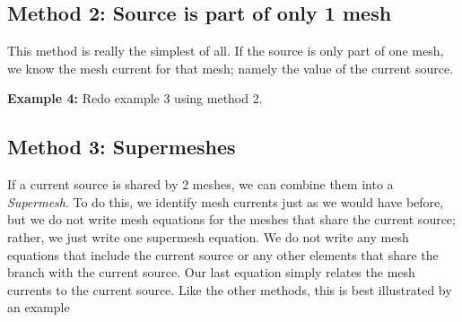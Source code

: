 \documentclass{handout}
\begin{document}
\newpage
\clearpage
\pagebreak

\subsection{Method 2: Source is part of only 1 mesh}
This method is really the simplest of all.  If the source is only part of one mesh, we know the mesh current for that mesh; namely the value of the current source. 

\textbf{Example 4:} Redo example 3 using method 2.

\newpage
\clearpage
\pagebreak

\subsection{Method 3: Supermeshes}
If a current source is shared by 2 meshes, we can combine them into a {\em Supermesh}.  To do this, we identify mesh currents just as we would have before, but we do not write mesh equations for the meshes that share the current source; rather, we just write one supermesh equation.  We do not write any mesh equations that include the current source or any other elements that share the branch with the current source.  Our last equation simply relates the mesh currents to the current source.  Like the other methods, this is best illustrated by an example
\end{document}

